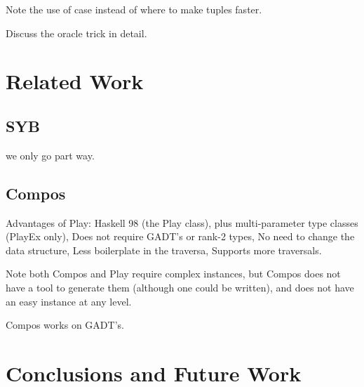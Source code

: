 \documentclass[preprint]{sigplanconf}
\begin{document}
Note the use of case instead of where to make tuples faster.

Discuss the oracle trick in detail.



\section{Related Work}

\subsection{SYB}

we only go part way.

\subsection{Compos}

Advantages of Play: Haskell 98 (the Play class), plus multi-parameter type classes (PlayEx only), Does not require GADT's or rank-2 types, No need to change the data structure, Less boilerplate in the traversa, Supports more traversals.

Note both Compos and Play require complex instances, but Compos does not have a tool to generate them (although one could be written), and does not have an easy instance at any level.

Compos works on GADT's.


\section{Conclusions and Future Work}
\end{document}
